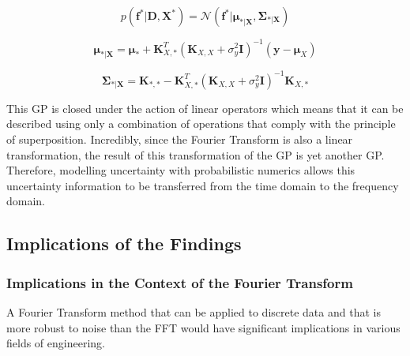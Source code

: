 \documentclass[12pt]{article}
\begin{document}
    \begin{equation}
        p(\mathbf{f}^* \vert \mathbf{D}, \mathbf{X}^*) = \mathcal{N}(\mathbf{f}^* \vert \boldsymbol{\mu}_{*\vert \mathbf{X}}, \boldsymbol{\Sigma}_{*\vert \mathbf{X}})\label{eq:18.51}
    \end{equation}

    \begin{equation}
        \boldsymbol{\mu}_{*\vert \mathbf{X}} = \boldsymbol{\mu}_* + \mathbf{K}_{X,*}^T (\mathbf{K}_{X,X} + \sigma^2_y \mathbf{I})^{-1} (\mathbf{y} - \boldsymbol{\mu}_X)\label{eq:18.52}
    \end{equation}

    \begin{equation}
        \boldsymbol{\Sigma}_{*\vert \mathbf{X}} = \mathbf{K}_{*,*} - \mathbf{K}_{X,*}^T (\mathbf{K}_{X,X} + \sigma^2_y \mathbf{I})^{-1} \mathbf{K}_{X,*}\label{eq:18.53}
    \end{equation}


    This GP is closed under the action of linear operators which means that it can be described using only a combination of operations that comply with the principle of superposition.
    Incredibly, since the Fourier Transform is also a linear transformation, the result of this transformation of the GP is yet another GP\@.
    Therefore, modelling uncertainty with probabilistic numerics allows this uncertainty information to be transferred from the time domain to the frequency domain.



    \subsection{Implications of the Findings}

    \subsubsection{Implications in the Context of the Fourier Transform}

    A Fourier Transform method that can be applied to discrete data and that is more robust to noise than the FFT would have significant implications in various fields of engineering.
\end{document}
